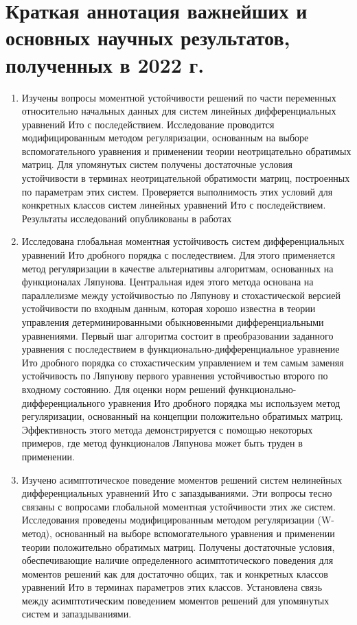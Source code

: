 \chapter{Краткая аннотация важнейших и основных научных результатов,
полученных в 2022 г.}

\begin{enumerate}

\item Изучены вопросы моментной устойчивости решений по части
переменных относительно начальных данных для систем линейных
дифференциальных уравнений Ито с последействием. Исследование
проводится модифицированным методом регуляризации, основанным на
выборе вспомогательного уравнения и применении теории неотрицательно
обратимых матриц. Для упомянутых систем получены достаточные условия устойчивости в терминах неотрицательной обратимости матриц,
построенных по параметрам этих систем. Проверяется выполнимость этих
условий для конкретных классов систем линейных уравнений Ито с
последействием. Результаты исследований опубликованы в работах 

\item Исследована глобальная моментная устойчивость систем
дифференциальных уравнений Ито дробного порядка с последествием. Для
этого применяется метод регуляризации в качестве альтернативы
алгоритмам, основанных на функционалах Ляпунова. Центральная идея
этого метода основана на параллелизме между устойчивостью по
Ляпунову и стохастической версией устойчивости по входным данным,
которая хорошо известна в теории управления детерминированными
обыкновенными дифференциальными уравнениями. Первый шаг алгоритма
состоит в преобразовании заданного уравнения с последествием в
функционально-дифференциальное уравнение Ито дробного порядка со
стохастическим управлением и тем самым заменяя устойчивость по
Ляпунову первого уравнения устойчивостью  второго по входному
состоянию. Для оценки норм решений функционально-дифференциального
уравнения Ито дробного порядка мы используем метод регуляризации,
основанный на концепции положительно обратимых матриц. Эффективность
этого метода демонстрируется с помощью некоторых примеров, где метод
функционалов Ляпунова может быть труден в применении. 

\item Изучено  асимптотическое поведение моментов решений систем
нелинейных дифференциальных уравнений Ито с запаздываниями. Эти
вопросы тесно связаны с вопросами глобальной моментная устойчивости
этих же систем. Исследования проведены модифицированным методом
регуляризации (W-метод), основанный на выборе вспомогательного
уравнения и применении теории положительно обратимых матриц.
Получены достаточные условия, обеспечивающие наличие определенного
асимптотического поведения для моментов решений как для достаточно
общих, так и конкретных классов уравнений Ито в терминах параметров
этих классов. Установлена связь между асимптотическим поведением
моментов решений для упомянутых систем и запаздываниями. 

\end{enumerate}


